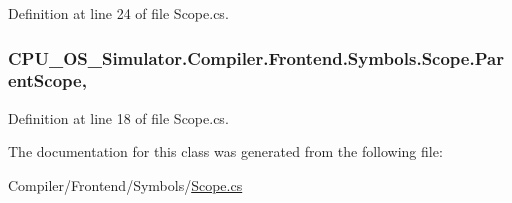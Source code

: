 Definition at line 24 of file Scope.\+cs.

\hypertarget{class_c_p_u___o_s___simulator_1_1_compiler_1_1_frontend_1_1_symbols_1_1_scope_abac9b9beb5da3ae1395d91d223889809}{}
\subsubsection[{Parent\+Scope}]{ C\+P\+U\+\_\+\+O\+S\+\_\+\+Simulator.\+Compiler.\+Frontend.\+Symbols.\+Scope.\+Parent\+Scope\hspace{0.3cm}{\ttfamily [get]}, {\ttfamily [set]}}\label{class_c_p_u___o_s___simulator_1_1_compiler_1_1_frontend_1_1_symbols_1_1_scope_abac9b9beb5da3ae1395d91d223889809}


Definition at line 18 of file Scope.\+cs.



The documentation for this class was generated from the following file\+:\begin{DoxyCompactItemize}
\item 
Compiler/\+Frontend/\+Symbols/\hyperlink{_scope_8cs}{Scope.\+cs}\end{DoxyCompactItemize}
